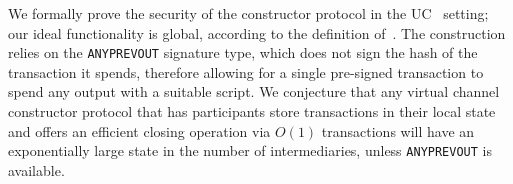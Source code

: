   We formally prove the security of the constructor protocol in the
  UC~\cite{uc} setting; our ideal functionality is global, according to the
  definition of~\cite{DBLP:conf/tcc/BadertscherCHTZ20}. The construction relies
  on the \texttt{ANYPREVOUT}
  signature type, which does not sign the hash of the transaction it spends,
  therefore allowing for a single pre-signed transaction to spend any output
  with a suitable script. We conjecture that any virtual channel constructor protocol that
  has participants store transactions in their local state
  and offers an efficient closing operation via $O(1)$ transactions
  will have an exponentially large state in the number of intermediaries, unless
  \texttt{ANYPREVOUT} is available.
